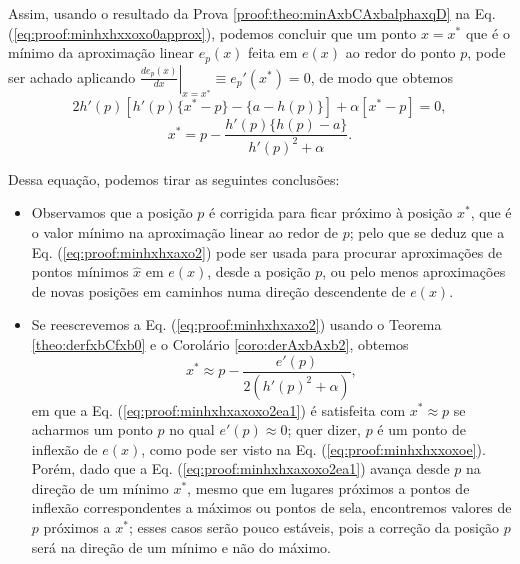 \begin{myproofT}
Assim, usando o resultado da Prova \ref{proof:theo:minAxbCAxbalphaxqD} na Eq. (\ref{eq:proof:minhxhxxoxo0approx}), 
podemos concluir que um ponto $x=x^*$ que é 
o mínimo da aproximação linear $e_p(x)$ feita em $e(x)$ ao redor do ponto $p$,
pode ser achado aplicando $\left. \frac{d e_p(x)}{d x }\right|_{x=x^*} \equiv e_{p}'(x^*) =0$,
de modo que obtemos
\begin{equation}\label{eq:proof:minhxhxaxo2a}
 2 h'(p)[h'(p)\{x^*-p\} -\{a-h(p)\}] + \alpha [x^*-p] = 0,
\end{equation} 
\begin{equation}\label{eq:proof:minhxhxaxo2}
x^* = p - \frac{h'(p)\{h(p)-a\}}{ h'(p)^2+\alpha}.
\end{equation} 


Dessa equação, podemos tirar as seguintes conclusões:
\begin{itemize}

\item Observamos que a posição $p$ é corrigida para ficar próximo à posição $x^*$, 
que é o valor mínimo na aproximação linear ao redor de $p$;
pelo que se deduz que a Eq. (\ref{eq:proof:minhxhxaxo2})
pode ser usada para procurar aproximações de pontos mínimos $\hat{x}$ em $e(x)$, desde a posição $p$,
ou pelo menos aproximações de novas posições em caminhos numa direção descendente de $e(x)$.

\item Se reescrevemos a Eq. (\ref{eq:proof:minhxhxaxo2}) usando o Teorema \ref{theo:derfxbCfxb0}
e o Corolário \ref{coro:derAxbAxb2},
obtemos
\begin{equation}\label{eq:proof:minhxhxaxoxo2ea1}
x^* \approx p - \frac{ e'(p)}{2(h'(p)^2+\alpha)},
\end{equation}
em que a Eq. (\ref{eq:proof:minhxhxaxoxo2ea1}) é satisfeita 
com $x^* \approx p$
se acharmos um  ponto $p$ no qual  
$e'(p)\approx 0$; 
quer dizer, $p$ é um ponto de inflexão de $e(x)$, como pode ser visto na Eq. (\ref{eq:proof:minhxhxxoxoe}).
Porém, dado que a Eq. (\ref{eq:proof:minhxhxaxoxo2ea1}) avança desde $p$ na direção de um mínimo $x^*$, 
mesmo que em lugares próximos a pontos de inflexão correspondentes a máximos ou pontos de sela,
encontremos valores de $p$ próximos a $x^*$;
 esses casos serão pouco estáveis, pois
a correção da posição $p$ será na direção de um mínimo e não do máximo.


\end{itemize}
\end{myproofT}
